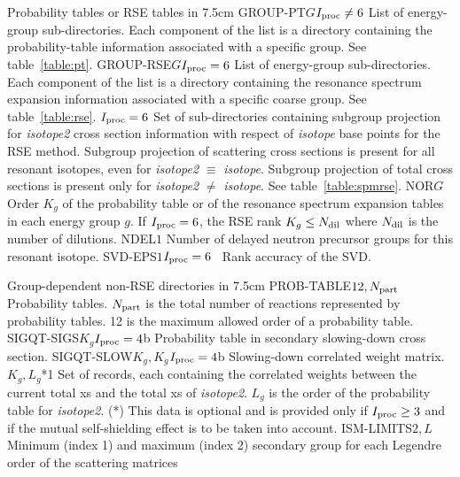 \begin{DescriptionEnregistrement}{Probability tables or RSE tables in }{7.5cm}
\OptDirlEnr
  {GROUP-PT}{$G$}{$I_{\rm proc}\ne 6$}
  {List of energy-group sub-directories. Each component of the list is a directory containing
  the probability-table information associated with a specific group. See table~\ref{table:pt}.}
\OptDirlEnr
  {GROUP-RSE}{$G$}{$I_{\rm proc}= 6$}
  {List of energy-group sub-directories. Each component of the list is a directory containing
  the resonance spectrum expansion information associated with a specific coarse group. See table~\ref{table:rse}.}
\OptDirVar
  {}{$I_{\rm proc}= 6$}
  {Set of sub-directories containing subgroup projection for {\sl isotope2} cross section information with
  respect of {\sl isotope} base points for the RSE method. Subgroup projection of scattering cross sections is present for all
  resonant isotopes, even for {\sl isotope2} $\equiv$ {\sl isotope}. Subgroup projection of total cross sections is
  present only for {\sl isotope2} $\neq$ {\sl isotope}. See table~\ref{table:spmrse}.}
\IntEnr
  {NOR}{$G$}
  {Order $K_g$ of the probability table or of the resonance spectrum expansion tables in each energy group $g$.
  If $I_{\rm proc}= 6$, the RSE rank $K_g \le N_{\rm dil}$ where $N_{\rm dil}$ is the number of dilutions.}
\IntEnr
  {NDEL}{$1$}
  {Number of delayed neutron precursor groups for this resonant isotope.}
\OptRealEnr
  {SVD-EPS}{$1$}{$I_{\rm proc}= 6$}{~}
  {Rank accuracy of the SVD.}
\end{DescriptionEnregistrement}

\vskip -0.4cm

\begin{DescriptionEnregistrement}{Group-dependent non-RSE directories in }{7.5cm}\label{table:pt}
\RealEnr
  {PROB-TABLE}{$12,N_{\rm part}$}{~}
  {Probability tables. $N_{\rm part}$ is the total number of reactions
   represented by probability tables. 12 is the maximum allowed order of a
   probability table.}
\OptRealEnr
  {SIGQT-SIGS}{$K_g$}{$I_{\rm proc}=4$}{b}
  {Probability table in secondary slowing-down cross section.}
\OptRealEnr
  {SIGQT-SLOW}{$K_g,K_g$}{$I_{\rm proc}=4$}{b}
  {Slowing-down correlated weight matrix.}
\OptRealVar
  {}{$K_g,L_g$}{*}{1}
  {Set of records, each containing the correlated weights
  between the current total xs and the total xs of {\sl isotope2}. $L_g$ is the
  order of the probability table for {\sl isotope2}. (*) This data is optional
  and is provided only if $I_{\rm proc}\ge 3$ and if the mutual self-shielding
  effect is to be taken into account.}
\IntEnr
  {ISM-LIMITS}{$2,L$}
  {Minimum (index 1) and maximum (index 2) secondary group for each Legendre
   order of the scattering matrices}
\end{DescriptionEnregistrement}

